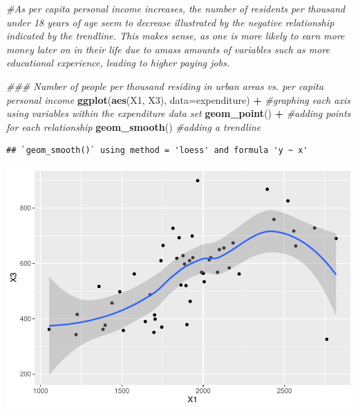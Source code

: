 \documentclass[]{article}
\newenvironment{Shaded}{\begin{snugshade}}{\end{snugshade}}
\newcommand{\CommentTok}[1]{\textcolor[rgb]{0.56,0.35,0.01}{\textit{#1}}}
\newcommand{\DataTypeTok}[1]{\textcolor[rgb]{0.13,0.29,0.53}{#1}}
\newcommand{\KeywordTok}[1]{\textcolor[rgb]{0.13,0.29,0.53}{\textbf{#1}}}
\newcommand{\NormalTok}[1]{#1}
\newcommand{\OperatorTok}[1]{\textcolor[rgb]{0.81,0.36,0.00}{\textbf{#1}}}
\newcommand{\StringTok}[1]{\textcolor[rgb]{0.31,0.60,0.02}{#1}}
\begin{document}
\begin{Shaded}
\begin{Highlighting}[]
\CommentTok{#As per capita personal income increases, the number of residents per thousand under 18 years of age seem to decrease illustrated by the negative relationship indicated by the trendline. This makes sense, as one is more likely to earn more money later on in their life due to amass amounts of variables such as more educational experience, leading to higher paying jobs. }

\CommentTok{### Number of people per thousand residing in urban areas vs. per capita personal income}
\KeywordTok{ggplot}\NormalTok{(}\KeywordTok{aes}\NormalTok{(X1, X3), }\DataTypeTok{data=}\NormalTok{expenditure) }\OperatorTok{+}\StringTok{ }\CommentTok{#graphing each axis using variables within the expenditure data set}
\StringTok{  }\KeywordTok{geom_point}\NormalTok{() }\OperatorTok{+}\StringTok{ }\CommentTok{#adding points for each relationship}
\StringTok{  }\KeywordTok{geom_smooth}\NormalTok{() }\CommentTok{#adding a trendline}
\end{Highlighting}
\end{Shaded}

\begin{verbatim}
## `geom_smooth()` using method = 'loess' and formula 'y ~ x'
\end{verbatim}

\includegraphics{Problem-Set-Answers_files/figure-latex/unnamed-chunk-1-3.pdf}
\end{document}
